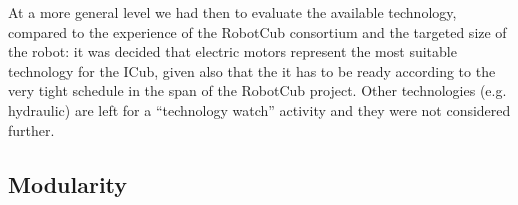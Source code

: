 At a more general level we had then to evaluate the available technology, compared 
to the experience of the RobotCub consortium and the targeted size of the robot: 
it was decided that electric motors represent the most suitable technology for 
the ICub, given also that the it has to be ready according to the very 
tight schedule in the span of the RobotCub project. Other technologies 
(e.g. hydraulic) are left for a ``technology watch'' activity and they were 
not considered further.





\subsection{Modularity}




